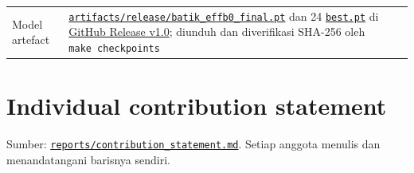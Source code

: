 \documentclass[10pt,a4paper]{article}
\begin{document}
{\begin{longtable}[]{@{}
  >{\raggedright\arraybackslash}p{}
  >{\raggedright\arraybackslash}p{}@{}}
Model artefact & \href{https://github.com/Universitas-Cakrawala/semarang-batik-fine-grained-transfer-learning/releases/tag/v1.0}{\texttt{artifacts/\allowbreak{}release/\allowbreak{}batik\_\allowbreak{}effb0\_\allowbreak{}final.pt}} dan 24 \href{https://github.com/Universitas-Cakrawala/semarang-batik-fine-grained-transfer-learning/releases/tag/v1.0}{\texttt{best.pt}} di \href{https://github.com/Universitas-Cakrawala/semarang-batik-fine-grained-transfer-learning/releases/tag/v1.0}{GitHub Release v1.0}; diunduh dan diverifikasi SHA-256 oleh \texttt{make\ checkpoints} \\
\end{longtable}
}

\section{Individual contribution statement}\label{individual-contribution-statement}

Sumber: \href{https://github.com/Universitas-Cakrawala/semarang-batik-fine-grained-transfer-learning/blob/main/reports/contribution_statement.md}{\texttt{reports/\allowbreak{}contribution\_\allowbreak{}statement.md}}. Setiap anggota menulis dan menandatangani barisnya sendiri.
\end{document}
